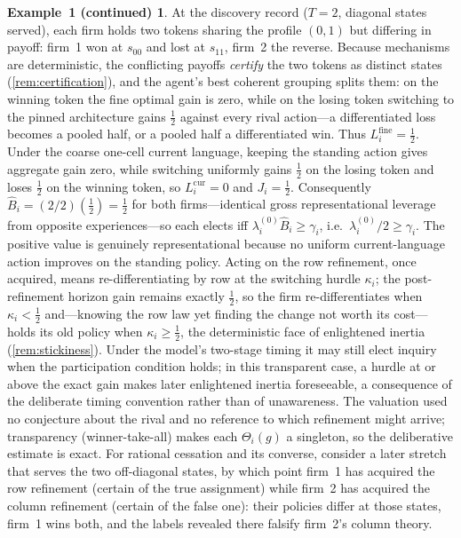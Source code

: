 \documentclass[11pt]{article}
\theoremstyle{definition}
\newtheorem*{excont}{Example~1 (continued)}
\begin{document}
\begin{excont}
At the discovery record ($T=2$, diagonal states served), each firm holds two tokens sharing the profile $(0,1)$ but differing in payoff: firm~1 won at $s_{00}$ and lost at $s_{11}$, firm~2 the reverse.
Because mechanisms are deterministic, the conflicting payoffs \emph{certify} the two tokens as distinct states (\cref{rem:certification}), and the agent's best coherent grouping splits them: on the winning token the fine optimal gain is zero, while on the losing token switching to the pinned architecture gains $\tfrac12$ against every rival action---a differentiated loss becomes a pooled half, or a pooled half a differentiated win.
Thus $L_i^{\mathrm{fine}}=\tfrac12$.
Under the coarse one-cell current language, keeping the standing action gives aggregate gain zero, while switching uniformly gains $\tfrac12$ on the losing token and loses $\tfrac12$ on the winning token, so $L_i^{\mathrm{cur}}=0$ and $J_i=\tfrac12$.
Consequently $\widehat B_i=(2/2)(\tfrac12)=\tfrac12$ for both firms---identical gross representational leverage from opposite experiences---so each elects iff $\lambda_i^{(0)}\widehat B_i\geq\gamma_i$, i.e.\ $\lambda_i^{(0)}/2\geq\gamma_i$.
The positive value is genuinely representational because no uniform current-language action improves on the standing policy.
Acting on the row refinement, once acquired, means re-differentiating by row at the switching hurdle $\kappa_i$; the post-refinement horizon gain remains exactly $\tfrac12$, so the firm re-differentiates when $\kappa_i<\tfrac12$ and---knowing the row law yet finding the change not worth its cost---holds its old policy when $\kappa_i\geq\tfrac12$, the deterministic face of enlightened inertia (\cref{rem:stickiness}).
Under the model's two-stage timing it may still elect inquiry when the participation condition holds; in this transparent case, a hurdle at or above the exact gain makes later enlightened inertia foreseeable, a consequence of the deliberate timing convention rather than of unawareness.
The valuation used no conjecture about the rival and no reference to which refinement might arrive; transparency (winner-take-all) makes each $\Theta_i(g)$ a singleton, so the deliberative estimate is exact.
For rational cessation and its converse, consider a later stretch that serves the two off-diagonal states, by which point firm~1 has acquired the row refinement (certain of the true assignment) while firm~2 has acquired the column refinement (certain of the false one): their policies differ at those states, firm~1 wins both, and the labels revealed there falsify firm~2's column theory.

\end{excont}
\end{document}
